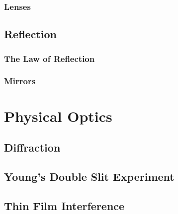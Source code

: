 		\subsubsection{Lenses} 

		

	\subsection{Reflection}
		\subsubsection{The Law of Reflection}
		\subsubsection{Mirrors}
		
	\section{Physical Optics}
		\subsection{Diffraction}
		\subsection{Young's Double Slit Experiment}
		\subsection{Thin Film Interference}
		
		
		
	

	


